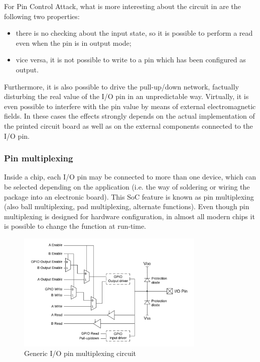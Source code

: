 For Pin Control Attack, what is more interesting about the circuit in  are the following two properties:
\begin{itemize}
	\item there is no checking about the input state, so it is possible to perform a read even when the pin is in output mode;
	\item vice versa, it is not possible to write to a pin which has been configured as output.
\end{itemize}

Furthermore, it is also possible to drive the pull-up/down network, factually disturbing the real value of the I/O pin in an unpredictable way.
Virtually, it is even possible to interfere with the pin value by means of external electromagnetic fields.
In these cases the effects strongly depends on the actual implementation of the printed circuit board as well as on the external components connected to the I/O pin.


\subsubsection{Pin multiplexing}

Inside a chip, each I/O pin may be connected to more than one device, which can be selected depending on the application
(i.e. the way of soldering or wiring the package into an electronic board).
This SoC feature is known as pin multiplexing (also ball multiplexing, pad multiplexing, alternate functions).
Even though pin multiplexing is designed for hardware configuration, in almost all modern chips it is possible to change the function at run-time.

\begin{figure}[h]
\centerline{\includegraphics[width=0.8\textwidth]{res/pinmux}}
\caption{Generic I/O pin multiplexing circuit \label{fig:pinmux}}
\end{figure}

